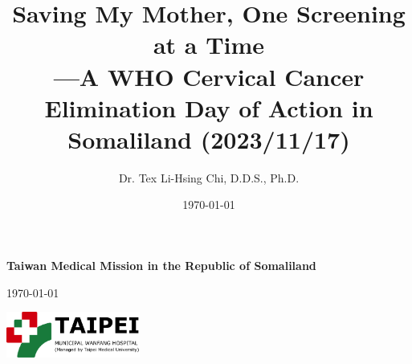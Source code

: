 \documentclass{article}
\title{Saving My Mother, One Screening at a Time  \\
---A WHO Cervical Cancer Elimination Day of Action in Somaliland (2023/11/17)}
\author{Dr. Tex Li-Hsing Chi, D.D.S., Ph.D.}
\date{\today}
\begin{document}
\begin{titlepage}

\hspace*{-0.7cm}%
\begin{tikzpicture} %


\hspace{1.4cm}
%

\end{tikzpicture}
    \vspace{2cm}
    
\centering
    {\Huge\bfseries Taiwan Medical Mission in the Republic of Somaliland \\
    \par } %
    \vspace{1.5cm}
    {\Large \today \par}


\vspace{2.0cm}
%
\includegraphics[height=1.5cm]{TMWH_logo_TAIPEI_vector.pdf}
\\
\vspace{2.5cm}

\hspace{0.5cm}

\end{titlepage}



\maketitle
\end{document}

